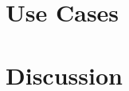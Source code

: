 \documentclass[conference]{IEEEtran}
\begin{document}
\section{Use Cases}
\label{sec:usecases}


\section{Discussion}
\label{sec:discussion}


\vfill\eject



\end{document}
